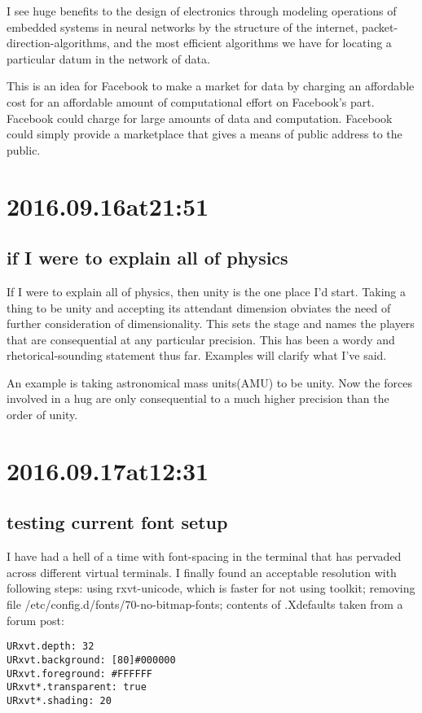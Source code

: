 \begin{enumerate}
\begin{enumerate}
I see huge benefits to the design of electronics through modeling operations of embedded systems in neural networks by the structure of the internet, packet-direction-algorithms, and the most efficient algorithms we have for locating a particular datum in the network of data.

This is an idea for Facebook to make a market for data by charging an affordable cost for an affordable amount of computational effort on Facebook's part. Facebook could charge for large amounts of data and computation. Facebook could simply provide a marketplace that gives a means of public address to the public.


\section*{ 2016.09.16at21:51 }
\subsection*{ if I were to explain all of physics }
If I were to explain all of physics, then unity is the one place I'd start. Taking a thing to be unity and accepting its attendant dimension obviates the need of further consideration of dimensionality. This sets the stage and names the players that are consequential at any particular precision. This has been a wordy and rhetorical-sounding statement thus far. Examples will clarify what I've said.

An example is taking astronomical mass units(AMU) to be unity. Now the forces involved in a hug are only consequential to a much higher precision than the order of unity.

\section*{ 2016.09.17at12:31 }
\subsection*{ testing current font setup }
I have had a hell of a time with font-spacing in the terminal that has pervaded across different virtual terminals. I finally found an acceptable resolution with following steps:
using rxvt-unicode, which is faster for not using toolkit;
removing file /etc/config.d/fonts/70-no-bitmap-fonts;
contents of .Xdefaults taken from a forum post:

\begin{lstlisting}
URxvt.depth: 32
URxvt.background: [80]#000000
URxvt.foreground: #FFFFFF
URxvt*.transparent: true
URxvt*.shading: 20


\end{lstlisting}
\end{enumerate}
\end{enumerate}

